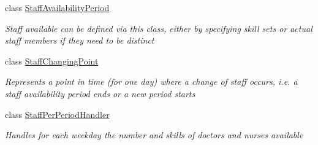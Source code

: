 \begin{DoxyCompactItemize}
class \hyperlink{class_general_health_care_elements_1_1_staff_handling_1_1_staff_availability_period}{Staff\+Availability\+Period}
\begin{DoxyCompactList}\small\item\em Staff available can be defined via this class, either by specifying skill sets or actual staff members if they need to be distinct \end{DoxyCompactList}\item 
class \hyperlink{class_general_health_care_elements_1_1_staff_handling_1_1_staff_changing_point}{Staff\+Changing\+Point}
\begin{DoxyCompactList}\small\item\em Represents a point in time (for one day) where a change of staff occurs, i.\+e. a staff availability period ends or a new period starts \end{DoxyCompactList}\item 
class \hyperlink{class_general_health_care_elements_1_1_staff_handling_1_1_staff_per_period_handler}{Staff\+Per\+Period\+Handler}
\begin{DoxyCompactList}\small\item\em Handles for each weekday the number and skills of doctors and nurses available \end{DoxyCompactList}\end{DoxyCompactItemize}
